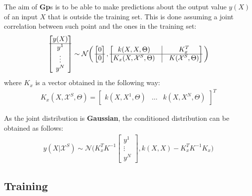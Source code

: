 \documentclass{article}
\begin{document}
The aim of \textbf{Gp}s is to be able to make predictions about the output value $y(X)$ of an input $X$ that is outside the training set. This is done assuming a joint correlation between such point and the ones in the training set: 
\begin{eqnarray}
\begin{bmatrix} y(X) \\ \hline y^1 \\ \vdots \\ y^N \end{bmatrix} \sim \mathcal{N} 
\bigg (
\begin{bmatrix} 0 \\ \hline 0 \end{bmatrix},
\begin{bmatrix}
k(X,X, \Theta) & \vline & K_x^T \\ 
\hline
K_x(X, \mathcal{X}^S, \Theta) & \vline & K(\mathcal{X}^S, \Theta)
\end{bmatrix}
\bigg )
\end{eqnarray}
where $K_x$ is a vector obtained in the following way:
\begin{eqnarray}
K_x(X, \mathcal{X}^S, \Theta) = \begin{bmatrix}
k(X, X^1 , \Theta) & \hdots & k(X, X^N , \Theta)
\end{bmatrix} ^ T
\end{eqnarray}

As the joint distribution is \textbf{Gaussian}, the conditioned distribution can be obtained as follows:
\begin{eqnarray}
y(X | \mathcal{X}^S) \sim \mathcal{N} \bigg ( 
K_x^T K^{-1} \begin{bmatrix} y^1 \\ \vdots \\ y^N \end{bmatrix} , 
k(X,X) - K_x^T K^{-1}K_x
\bigg )
\end{eqnarray}

\subsection{Training}
\end{document}
